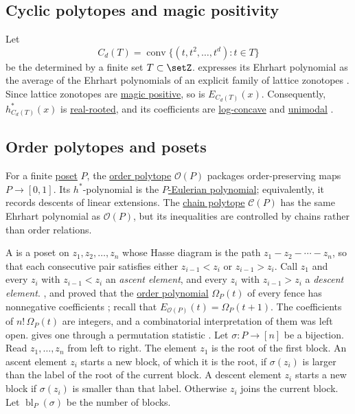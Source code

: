 \subsection[cyclicPolytopeMagicPositivity]{Cyclic polytopes and magic positivity}

Let
\[
  C_d(T)=\operatorname{conv}\{(t,t^2,\dotsc,t^d):t\in T\}
\]
be the 
\label{integralCyclicPolytope} determined by a finite set $T\subset\setZ$.
 expresses its Ehrhart polynomial as the average of the
Ehrhart polynomials of an explicit family of lattice zonotopes
\cite[Thm.~1.1]{Konoike2026x}.  Since lattice zonotopes are
\hyperref[magicPositivePolynomial]{magic positive}, so is $E_{C_d(T)}(x)$.
Consequently, $h^*_{C_d(T)}(x)$ is
\hyperref[realRootedPolynomial]{real-rooted}, and its coefficients are
\hyperref[logConcavePolynomial]{log-concave} and
\hyperref[unimodalPolynomial]{unimodal} \cite[Cor.~1.2]{Konoike2026x}.

\subsection[ehrhartPosets]{Order polytopes and posets}

For a finite \hyperref[poset]{poset} \(P\), the
\hyperref[orderPolytope]{order polytope} \(\mathcal O(P)\) packages
order-preserving maps \(P\to[0,1]\).  Its \(h^*\)-polynomial is the
\hyperref[pEulerianPolynomial]{\(P\)-Eulerian polynomial}; equivalently, it
records descents of linear extensions.  The
\hyperref[chainPolytope]{chain polytope} \(\mathcal C(P)\) has the same
Ehrhart polynomial as \(\mathcal O(P)\), but its inequalities are controlled
by chains rather than order relations.

A \label{fencePoset} is a poset on
\(z_1,z_2,\dotsc,z_n\) whose Hasse diagram is the path
\(z_1 - z_2 - \dotsb - z_n\), so that each consecutive pair satisfies either
\(z_{i-1}<z_i\) or \(z_{i-1}>z_i\).  Call \(z_1\) and every \(z_i\) with
\(z_{i-1}<z_i\) an \emph{ascent element}, and every \(z_i\) with
\(z_{i-1}>z_i\) a \emph{descent element}.
,  and 
proved that the \hyperref[orderPolynomial]{order polynomial}
\(\Omega_P(t)\) of every fence has nonnegative coefficients
\cite{FerroniMoralesPanova2026}; recall that
\(E_{\mathcal O(P)}(t)=\Omega_P(t+1)\).  The coefficients of
\(n!\,\Omega_P(t)\) are integers, and a combinatorial interpretation of them
was left open.   gives one through a permutation statistic
\cite{Kahane2026x}.
Let \(\sigma\colon P\to[n]\) be a bijection.  Read \(z_1,\dotsc,z_n\) from
left to right.  The element \(z_1\) is the root of the first block.  An ascent
element \(z_i\) starts a new block, of which it is the root, if
\(\sigma(z_i)\) is larger than the label of the root of the current block.
A descent element \(z_i\) starts a new block if \(\sigma(z_i)\) is smaller
than that label.  Otherwise \(z_i\) joins the current block.  Let
\(\operatorname{bl}_P(\sigma)\) be the number of blocks.

